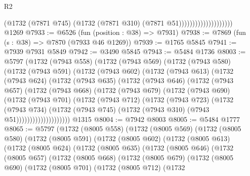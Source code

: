 \begin{lexlean}{R2}
\begin{coremodule}
                                      (@1732
                                        (@7871 @745)
                                        (@1732 (@7871 @310) (@7871 @51))))))))))))))))))))
    @1269
@7933 := @6526 (fun (position : @38) => @7931)
@7938 := @7869 (fun (s : @38) => @7870 (@7933 @46 @1269))
@7939 := @1765 @5845
@7941 := @7939 @7931 @5849
@7942 := @3490 @5845
@7943 := @5484 @1736
@8003 := @5797
    (@1732
      (@7943 @558)
      (@1732
        (@7943 @569)
        (@1732
          (@7943 @580)
          (@1732
            (@7943 @591)
            (@1732
              (@7943 @602)
              (@1732
                (@7943 @613)
                (@1732
                  (@7943 @624)
                  (@1732
                    (@7943 @635)
                    (@1732
                      (@7943 @646)
                      (@1732
                        (@7943 @657)
                        (@1732
                          (@7943 @668)
                          (@1732
                            (@7943 @679)
                            (@1732
                              (@7943 @690)
                              (@1732
                                (@7943 @701)
                                (@1732
                                  (@7943 @712)
                                  (@1732
                                    (@7943 @723)
                                    (@1732
                                      (@7943 @734)
                                      (@1732
                                        (@7943 @745)
                                        (@1732 (@7943 @310) (@7943 @51))))))))))))))))))))
    @1315
@8004 := @7942 @8003
@8005 := @5484 @1777
@8065 := @5797
    (@1732
      (@8005 @558)
      (@1732
        (@8005 @569)
        (@1732
          (@8005 @580)
          (@1732
            (@8005 @591)
            (@1732
              (@8005 @602)
              (@1732
                (@8005 @613)
                (@1732
                  (@8005 @624)
                  (@1732
                    (@8005 @635)
                    (@1732
                      (@8005 @646)
                      (@1732
                        (@8005 @657)
                        (@1732
                          (@8005 @668)
                          (@1732
                            (@8005 @679)
                            (@1732
                              (@8005 @690)
                              (@1732
                                (@8005 @701)
                                (@1732
                                  (@8005 @712)
                                  (@1732

\end{coremodule}
\end{lexlean}
